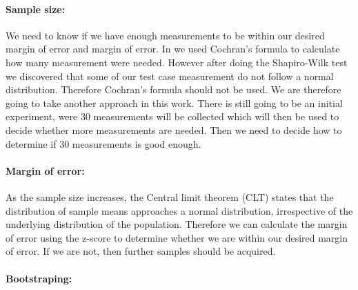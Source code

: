 \paragraph{Sample size:}
We need to know if we have enough measurements to be within our desired margin of error and margin of error. In \cite{biksbois} we used Cochran's formula to calculate how many measurement were needed. However after doing the Shapiro-Wilk test we discovered that some of our test case measurement do not follow a normal distribution. Therefore Cochran's formula should not be used. We are therefore going to take another approach in this work. There is still going to be an initial experiment, were 30 measurements will be collected which will then be used to decide whether more measurements are needed. Then we need to decide how to determine if 30 measurements is good enough.

\paragraph{Margin of error:} As the sample size increases, the Central limit theorem (CLT) states that the distribution of sample means approaches a normal distribution, irrespective of the underlying distribution of the population. Therefore we can calculate the margin of error using the z-score to determine whether we are within our desired margin of error. If we are not, then further samples should be acquired.

\paragraph{Bootstraping:}